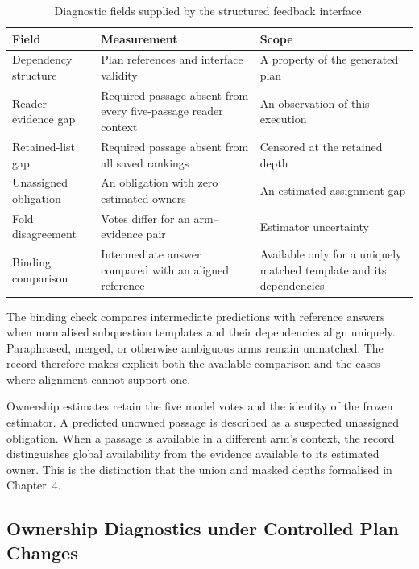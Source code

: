 \begin{table}[H]
\centering
\small
\caption{Diagnostic fields supplied by the structured feedback interface.}
\label{tab:ch5-diagnostics}
\begin{tabular}{p{}p{}p{}}
\hline
Field & Measurement & Scope \\
\hline
Dependency structure & {\raggedright Plan references and interface validity\par}
  & A property of the generated plan \\
Reader evidence gap & Required passage absent from every five-passage reader
  context & An observation of this execution \\
Retained-list gap & Required passage absent from all saved rankings
  & Censored at the retained depth \\
Unassigned obligation & An obligation with zero estimated owners
  & An estimated assignment gap \\
Fold disagreement & Votes differ for an arm--evidence pair
  & Estimator uncertainty \\
Binding comparison & Intermediate answer compared with an aligned reference
  & Available only for a uniquely matched template and its dependencies \\
\hline
\end{tabular}
\end{table}

The binding check compares intermediate predictions with reference answers
when normalised subquestion templates and their dependencies align uniquely.
Paraphrased, merged, or otherwise ambiguous arms remain unmatched. The record
therefore makes explicit both the available comparison and the cases where
alignment cannot support one.

Ownership estimates retain the five model votes and the identity of the
frozen estimator. A predicted unowned passage is described as a suspected
unassigned obligation. When a passage is available in a different arm's
context, the record distinguishes global availability from the evidence
available to its estimated owner. This is the distinction that the union and
masked depths formalised in Chapter~4.

\subsection{Ownership Diagnostics under Controlled Plan Changes}
\label{sec:ch5-ownership-checks}

